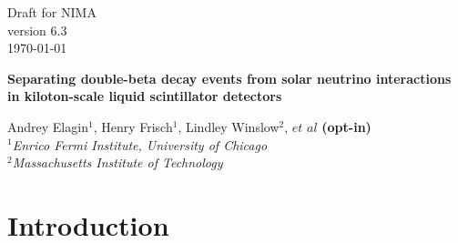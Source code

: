 \documentclass[12pt,twoside,letterpaper]{article}
\newcommand{\vbb}{0\nu\beta\beta}
\newcommand{\B}{^{8}B}
\begin{document}
\vspace*{-3.5cm}
\begin{flushright}
Draft for NIMA\\
version 6.3\\
\today
\end{flushright}



\begin{center}
  \begin{Large}
  {\bf Separating double-beta decay events from solar neutrino interactions in kiloton-scale liquid scintillator detectors}
  \end{Large}
\end{center}


\begin{center}
Andrey Elagin$^1$, Henry Frisch$^1$, Lindley Winslow$^2$, $et$ $al$ {\bf (opt-in)}\\
\emph{$^1$Enrico Fermi Institute, University of Chicago\\ 
$^2$Massachusetts Institute of Technology}
\end{center}



\begin{abstract}
We propose a technique for separating $\vbb$-decay events from background due to $\B$ solar neutrino interactions in a liquid scintillator detector. The technique compares event topology of the signal and background events using spherical harmonics analysis of the early light emitted in $\vbb$-decay and $\B$ events. Selection of early photons using fast photo-detectors allows for separation of directional Cherenkov from isotropic scintillation light and identification of two event topologies based on the spatial distribution of the early photons in the detector.
\end{abstract}

\newpage
\tableofcontents
\newpage





\section{Introduction}
\end{document}
